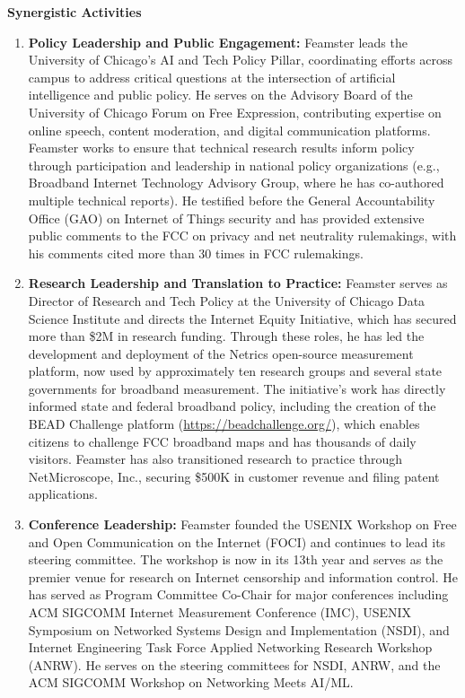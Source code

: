 \begin{center}
{\large \bf \TITLE}
\end{center}

\begin{center}
    {\bf Synergistic Activities}
\end{center}

\begin{enumerate}
    \itemsep=-1pt
    \item {\bf Policy Leadership and Public Engagement:} Feamster leads the University of Chicago's AI and Tech Policy Pillar, coordinating efforts across campus to address critical questions at the intersection of artificial intelligence and public policy. He serves on the Advisory Board of the University of Chicago Forum on Free Expression, contributing expertise on online speech, content moderation, and digital communication platforms. Feamster works to ensure that technical research results inform policy through participation and leadership in national policy organizations (e.g., Broadband Internet Technology Advisory Group, where he has co-authored multiple technical reports). He testified before the General Accountability Office (GAO) on Internet of Things security and has provided extensive public comments to the FCC on privacy and net neutrality rulemakings, with his comments cited more than 30 times in FCC rulemakings.

    \item {\bf Research Leadership and Translation to Practice:} Feamster serves as Director of Research and Tech Policy at the University of Chicago Data Science Institute and directs the Internet Equity Initiative, which has secured more than \$2M in research funding. Through these roles, he has led the development and deployment of the Netrics open-source measurement platform, now used by approximately ten research groups and several state governments for broadband measurement. The initiative's work has directly informed state and federal broadband policy, including the creation of the BEAD Challenge platform (\url{https://beadchallenge.org/}), which enables citizens to challenge FCC broadband maps and has thousands of daily visitors. Feamster has also transitioned research to practice through NetMicroscope, Inc., securing \$500K in customer revenue and filing patent applications.

    \item {\bf Conference Leadership:} Feamster founded the USENIX Workshop on Free and Open Communication on the Internet (FOCI) and continues to lead its steering committee. The workshop is now in its 13th year and serves as the premier venue for research on Internet censorship and information control. He has served as Program Committee Co-Chair for major conferences including ACM SIGCOMM Internet Measurement Conference (IMC), USENIX Symposium on Networked Systems Design and Implementation (NSDI), and Internet Engineering Task Force Applied Networking Research Workshop (ANRW). He serves on the steering committees for NSDI, ANRW, and the ACM SIGCOMM Workshop on Networking Meets AI/ML.


\end{enumerate}
